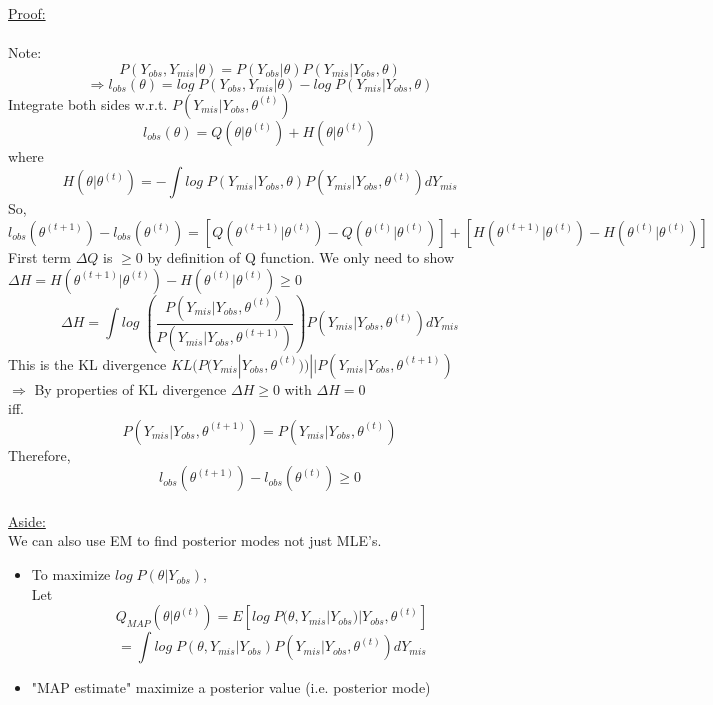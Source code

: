 \documentclass[12pt]{article}
\begin{document}
\underline{Proof:}\\\\
Note: $$P(Y_{obs}, Y_{mis}|\theta)=P(Y_{obs}|\theta)P(Y_{mis}|Y_{obs}, \theta)$$
$$\Rightarrow l_{obs}(\theta)= log\;P(Y_{obs}, Y_{mis}|\theta)-log\;P(Y_{mis}| Y_{obs},\theta)$$
Integrate both sides w.r.t. $P(Y_{mis}|Y_{obs}, \theta^{(t)})$\\
$$l_{obs}(\theta)= Q(\theta|\theta^{(t)})+H(\theta|\theta^{(t)})$$
where
$$H(\theta|\theta^{(t)})=-\int log\;P(Y_{mis}|Y_{obs},\theta)P(Y_{mis}|Y_{obs},\theta^{(t)})dY_{mis}$$
So,
$$l_{obs}(\theta^{(t+1)})-l_{obs}(\theta^{(t)})=[Q(\theta^{(t+1)}|\theta^{(t)})-Q(\theta^{(t)}|\theta^{(t)})]+[H(\theta^{(t+1)}|\theta^{(t)})-H(\theta^{(t)}|\theta^{(t)})]$$
First term $\Delta Q$ is $\geqslant 0$ by definition of Q function.
We only need to show $\Delta H = H(\theta^{(t+1)}|\theta^{(t)})-H(\theta^{(t)}|\theta^{(t)}) \geqslant 0 $
$$\Delta H =\int log\;(\dfrac{P(Y_{mis}|Y_{obs}, \theta^{(t)})}{P(Y_{mis}|Y_{obs}, \theta^{(t+1)})})P(Y_{mis}|Y_{obs}, \theta^{(t)})dY_{mis}$$
This is the KL divergence $KL(P(Y_{mis}|Y_{obs}, \theta^{(t)}))||P(Y_{mis}|Y_{obs}, \theta^{(t+1)})$\\
$\Rightarrow$ By properties of KL divergence $ \Delta H \geqslant 0$ with $\Delta H=0$ \\
iff. $$P(Y_{mis}|Y_{obs}, \theta^{(t+1)})=P(Y_{mis}|Y_{obs}, \theta^{(t)})$$
Therefore, $$l_{obs}(\theta^{(t+1)})-l_{obs}(\theta^{(t)})\geqslant 0$$\\

\underline {Aside:} \\
We can also use EM to find posterior modes not just MLE's.
\begin{itemize}
\item To maximize $log\;P(\theta|Y_{obs})$,\\
Let $$Q_{MAP}(\theta|\theta^{(t)})=E[log\;P(\theta, Y_{mis}|Y_{obs})|Y_{obs}, \theta^{(t)}]$$
$$=\int log\;P(\theta, Y_{mis}|Y_{obs})P(Y_{mis}|Y_{obs},\theta^{(t)})dY_{mis}$$
\item "MAP estimate" maximize a posterior value (i.e. posterior mode)
\end{itemize}
\end{document}

